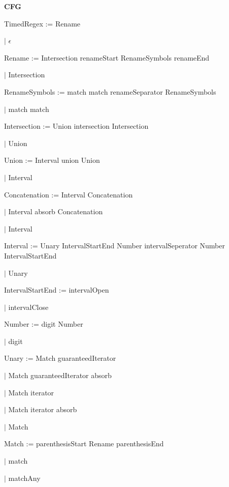 
\textbf{CFG}

TimedRegex := Rename

\qquad	$\mid$ $\epsilon$

Rename := Intersection renameStart RenameSymbols renameEnd

\qquad $\mid$ Intersection

RenameSymbols := match match renameSeparator RenameSymbols

\qquad $\mid$ match match

Intersection := Union intersection Intersection

\qquad $\mid$ Union

Union := Interval union Union

\qquad $\mid$ Interval

Concatenation := Interval Concatenation

\qquad $\mid$ Interval absorb Concatenation

\qquad $\mid$ Interval

Interval := Unary IntervalStartEnd Number intervalSeperator Number IntervalStartEnd

\qquad $\mid$ Unary

IntervalStartEnd := intervalOpen

\qquad $\mid$ intervalClose

Number := digit Number

\qquad $\mid$ digit

Unary := Match guaranteedIterator

\qquad $\mid$ Match guaranteedIterator absorb

\qquad $\mid$ Match iterator

\qquad $\mid$ Match iterator absorb

\qquad $\mid$ Match

Match := parenthesisStart Rename parenthesisEnd

\qquad $\mid$ match

\qquad $\mid$ matchAny

